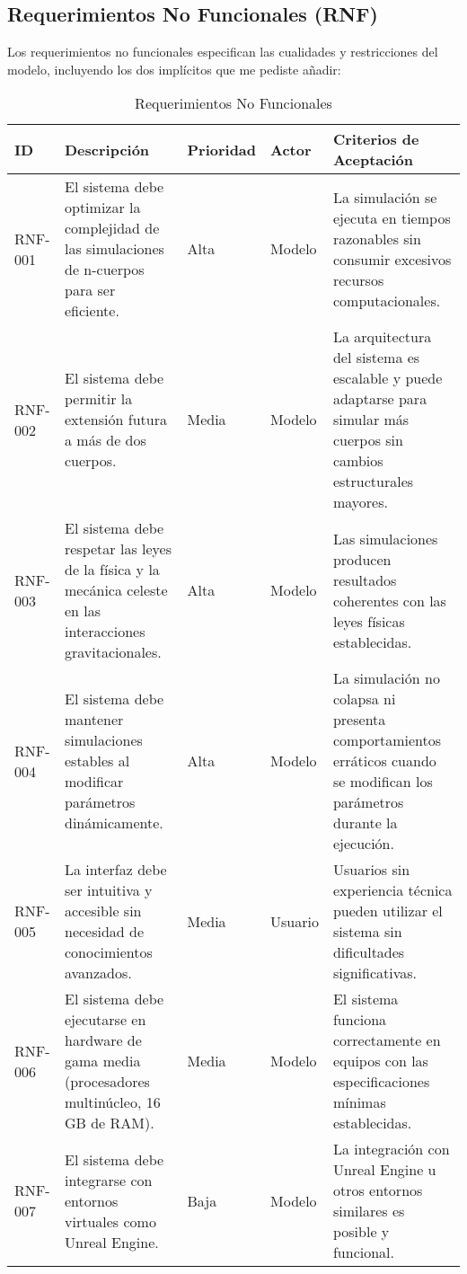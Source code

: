 \subsection{Requerimientos No Funcionales (RNF)}

Los requerimientos no funcionales especifican las cualidades y restricciones del modelo, incluyendo los dos implícitos que me pediste añadir:

\begin{table}[H]
    \centering
    \caption{Requerimientos No Funcionales}
    \begin{adjustbox}{width=\textwidth}
    \begin{tabular}{p{1.2cm}p{5cm}p{1.75cm}p{2.25cm}p{5cm}}
    \hline
    \textbf{ID} & \textbf{Descripción} & \textbf{Prioridad} & \textbf{Actor} & \textbf{Criterios de Aceptación} \\
    \hline
    RNF-001 & El sistema debe optimizar la complejidad de las simulaciones de n-cuerpos para ser eficiente. & Alta & Modelo & La simulación se ejecuta en tiempos razonables sin consumir excesivos recursos computacionales. \\
    \hline
    RNF-002 & El sistema debe permitir la extensión futura a más de dos cuerpos. & Media & Modelo & La arquitectura del sistema es escalable y puede adaptarse para simular más cuerpos sin cambios estructurales mayores. \\
    \hline
    RNF-003 & El sistema debe respetar las leyes de la física y la mecánica celeste en las interacciones gravitacionales. & Alta & Modelo & Las simulaciones producen resultados coherentes con las leyes físicas establecidas. \\
    \hline
    RNF-004 & El sistema debe mantener simulaciones estables al modificar parámetros dinámicamente. & Alta & Modelo & La simulación no colapsa ni presenta comportamientos erráticos cuando se modifican los parámetros durante la ejecución. \\
    \hline
    RNF-005 & La interfaz debe ser intuitiva y accesible sin necesidad de conocimientos avanzados. & Media & Usuario & Usuarios sin experiencia técnica pueden utilizar el sistema sin dificultades significativas. \\
    \hline
    RNF-006 & El sistema debe ejecutarse en hardware de gama media (procesadores multinúcleo, 16 GB de RAM). & Media & Modelo & El sistema funciona correctamente en equipos con las especificaciones mínimas establecidas. \\
    \hline
    RNF-007 & El sistema debe integrarse con entornos virtuales como Unreal Engine. & Baja & Modelo & La integración con Unreal Engine u otros entornos similares es posible y funcional. \\

\end{tabular}
\end{adjustbox}
\end{table}

